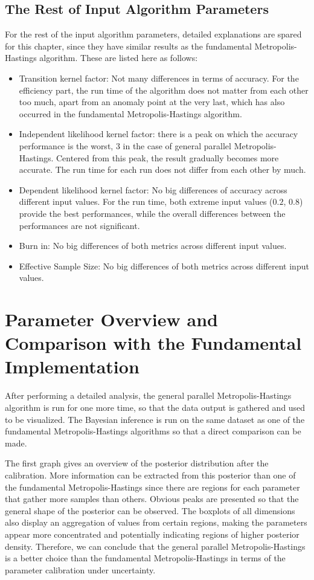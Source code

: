 \subsection{The Rest of Input Algorithm Parameters}
For the rest of the input algorithm parameters, detailed explanations are spared for this chapter, since they have similar results as the fundamental Metropolis-Hastings algorithm. These are listed here as follows: 
\begin{itemize}
    \item Transition kernel factor: Not many differences in terms of accuracy. For the efficiency part, the run time of the algorithm does not matter from each other too much, apart from an anomaly point at the very last, which has also occurred in the fundamental Metropolis-Hastings algorithm.
    \item Independent likelihood kernel factor: there is a peak on which the accuracy performance is the worst, $3$ in the case of general parallel Metropolis-Hastings. Centered from this peak, the result gradually becomes more accurate. The run time for each run does not differ from each other by much.
    \item Dependent likelihood kernel factor: No big differences of accuracy across different input values. For the run time, both extreme input values ($0.2$, $0.8$) provide the best performances, while the overall differences between the performances are not significant.
    \item Burn in: No big differences of both metrics across different input values.
    \item Effective Sample Size: No big differences of both metrics across different input values.
\end{itemize}

\section{Parameter Overview and Comparison with the Fundamental Implementation}
After performing a detailed analysis, the general parallel Metropolis-Hastings algorithm is run for one more time, so that the data output is gathered and used to be visualized. The Bayesian inference is run on the same dataset as one of the fundamental Metropolis-Hastings algorithms so that a direct comparison can be made. 

The first graph gives an overview of the posterior distribution after the calibration. More information can be extracted from this posterior than one of the fundamental Metropolis-Hastings since there are regions for each parameter that gather more samples than others. Obvious peaks are presented so that the general shape of the posterior can be observed. The boxplots of all dimensions also display an aggregation of values from certain regions, making the parameters appear more concentrated and potentially indicating regions of higher posterior density. Therefore, we can conclude that the general parallel Metropolis-Hastings is a better choice than the fundamental Metropolis-Hastings in terms of the parameter calibration under uncertainty.


